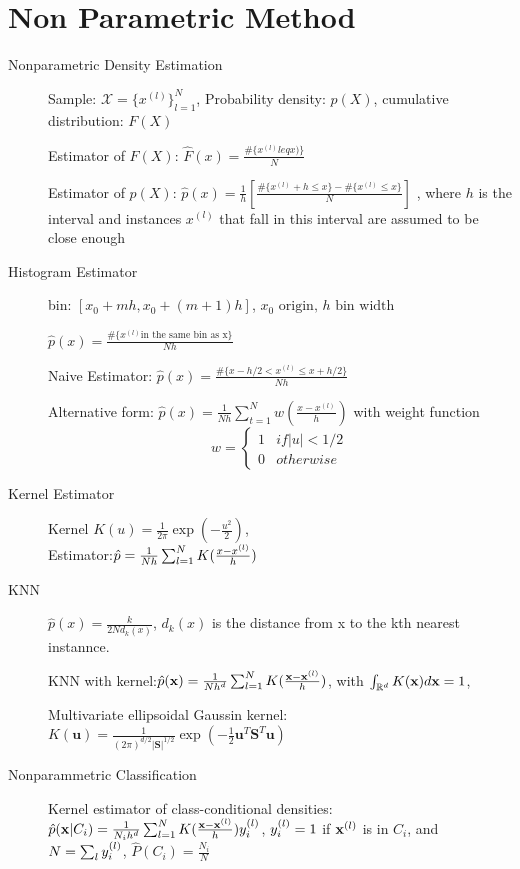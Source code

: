 \chapter{Non Parametric Method}
\begin{description}
    \item[Nonparametric Density Estimation]
    Sample: $\mathcal{X} = \{x^{(l)}\}^N_{l=1}$, 
    Probability density: $p(X)$, cumulative distribution: $F(X)$

    Estimator of $F(X)$:  $\hat{F}(x) = \frac{ \#\{x^{(l)} leq x)\}}{N}$

    Estimator of $p(X)$: $\hat{p}(x) = \frac{1}{h} [\frac{\#\{x^{(l)} + h \leq x\} -
    \#\{x^{(l)}  \leq x\} }{N}]$ , where $h$ is the interval and instances $x^{(l)}$
    that fall in this interval are assumed to be close enough

    \item[Histogram Estimator]
        bin: $[x_0 + mh, x_0 + (m+1)h]$, $x_0 \mbox{ origin, } h \mbox{ bin width }$

    $\hat{p}(x) = \frac{\#\{x^{(l)} \mbox{in the same bin as x}\}}{Nh}$

    Naive Estimator:
    $\hat{p}(x) = \frac{\#\{ x - h/2 < x^{(l)} \leq x + h/2\}}{Nh}$ 

    Alternative form: $\hat{p}(x) = \frac{1}{Nh} \sum^N_{t=1} w(\frac{x-x^{(l)}}{h})$
    with weight function \[w = \begin{cases} 1 & if |u| < 1/2 \\ 0 & otherwise
        \end{cases}\]

    \item[Kernel Estimator] Kernel $K(u) =
        \frac{1}{2\pi}\exp(-\frac{u^2}{2})$,\\
        Estimator:$\hat{p} = \frac{1}{Nh}\sum_{l=1}^N K(\frac{x-x^{(l)}}{h})$
    \item[KNN] $\hat{p}(x) = \frac{k}{2Nd_k(x)}$, $d_k(x)$ is the distance from
        x to the kth nearest instannce.

        KNN with kernel:$\hat{p}(\mathbf{x}) = \frac{1}{Nh^d}\sum_{l=1}^N
        K(\frac{\mathbf{x}-\mathbf{x}^{(l)}}{h})$, with $\int_{\mathbb{R}^d}K(\mathbf{x})d\mathbf{x} = 1$,

        Multivariate ellipsoidal Gaussin kernel: \\$K(\mathbf{u}) =
        \frac{1}{(2\pi)^{d/2}|\mathbf{S}|^{1/2}}\exp\left( -\frac{1}{2}
        \mathbf{u}^T\mathbf{S}^T\mathbf{u} \right)$
    \item[Nonparammetric Classification] 
        Kernel estimator of class-conditional densities: $\hat{p}(\mathbf{x}|C_i) =
        \frac{1}{N_ih^d}\sum_{l=1}^N K(\frac{\mathbf{x}-\mathbf{x}^{(l)}}{h})y^{(l)}_i$, $y^{(l)}_i = 1$ if $\mathbf{x}^{(l)}$
        is in $C_i$, and $N=\sum_l y^{(l)}_i$, $\hat{P}(C_i) = \frac{N_i}{N}$
        

\end{description}
